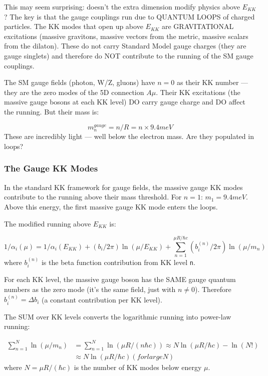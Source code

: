 \documentclass[aps,prd,preprint,superscriptaddress,longbibliography,floatfix]{revtex4-2}
\theoremstyle{remark}
\begin{document}
This may seem surprising: doesn't the extra dimension modify physics above $E_{KK}$? The key is that the gauge couplings run due to QUANTUM LOOPS of charged particles. The KK modes that open up above $E_{KK}$ are GRAVITATIONAL excitations (massive gravitons, massive vectors from the metric, massive scalars from the dilaton). These do not carry Standard Model gauge charges (they are gauge singlets) and therefore do NOT contribute to the running of the SM gauge couplings.

The SM gauge fields (photon, W/Z, gluons) have $n = 0$ as their KK number --- they are the zero modes of the 5D connection $A\mu$. Their KK excitations (the massive gauge bosons at each KK level) DO carry gauge charge and DO affect the running. But their mass is:


\begin{equation}
    m_n^{gauge} = n/R = n \times 9.4 meV
\end{equation}
These are incredibly light --- well below the electron mass. Are they populated in loops?


\subsubsection{The Gauge KK Modes}

In the standard KK framework for gauge fields, the massive gauge KK modes contribute to the running above their mass threshold. For $n = 1$: $m_{1} = 9.4 meV$. Above this energy, the first massive gauge KK mode enters the loops.

The modified running above $E_{KK}$ is:


\begin{equation}
    1/\alpha_{i}(\mu) = 1/\alpha_{i}(E_{KK}) + (b_{i}/2\pi) \ln(\mu/E_{KK}) + \sum_{n=1}^{\mu R/\hbar c} (b_{i}^{(n)}/2\pi) \ln(\mu/m_n)
\end{equation}
where $b_{i}^{(n)}$ is the beta function contribution from KK level \texttt{n}.

For each KK level, the massive gauge boson has the SAME gauge quantum numbers as the zero mode (it's the same field, just with $n \neq 0$). Therefore $b_{i}^{(n)} = \Delta b_{i}$ (a constant contribution per KK level).

The SUM over KK levels converts the logarithmic running into power-law running:


\begin{align}
    \sum_{n=1}^{N} \ln(\mu/m_n) &= \sum_{n=1}^{N} \ln(\mu R/(n\hbar c)) \approx N \ln(\mu R/\hbar c) - \ln(N!) \\
    & \approx N \ln(\mu R/\hbar c)  (for large N)
\end{align}
where $N = \mu R/(\hbar c)$ is the number of KK modes below energy $\mu$.
\end{document}
